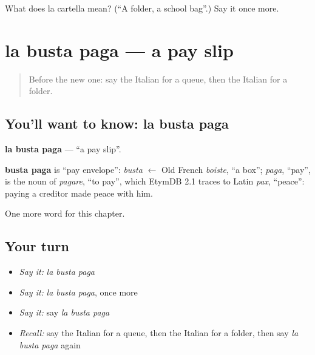 \begin{tcolorbox}[breakable,colback=teal!4,colframe=teal!35!black,title={Before you move on}]
What does la cartella mean? (\textquotedblleft{}A folder, a school bag\textquotedblright{}.) Say it once more.
\end{tcolorbox}
\section[la busta paga]{la busta paga — a pay slip}

\label{lesson:IT-C198-busta-paga}



\begin{quote}
Before the new one: say the Italian for a queue, then the Italian for a folder.
\end{quote}

\subsection*{You'll want to know: la busta paga}
\textbf{la busta paga} — \textquotedblleft{}a pay slip\textquotedblright{}.

\begin{cousinweb}
\textbf{busta paga} is \textquotedblleft{}pay envelope\textquotedblright{}: \emph{busta} $\leftarrow$ Old French \emph{boiste}, \textquotedblleft{}a box\textquotedblright{}; \emph{paga}, \textquotedblleft{}pay\textquotedblright{}, is the noun of \emph{pagare}, \textquotedblleft{}to pay\textquotedblright{}, which EtymDB 2.1 traces to Latin \emph{pax}, \textquotedblleft{}peace\textquotedblright{}: paying a creditor made peace with him.
\end{cousinweb}

\begin{grammarlens}[title={What you've built}]
One more word for this chapter.
\end{grammarlens}

\subsection*{Your turn}
\begin{itemize}
\raggedright
  \item \emph{Say it:} \emph{la busta paga}
  \item \emph{Say it:} \emph{la busta paga}, once more
  \item \emph{Say it:} say \emph{la busta paga}
  \item \emph{Recall:} say the Italian for a queue, then the Italian for a folder, then say \emph{la busta paga} again
\end{itemize}

